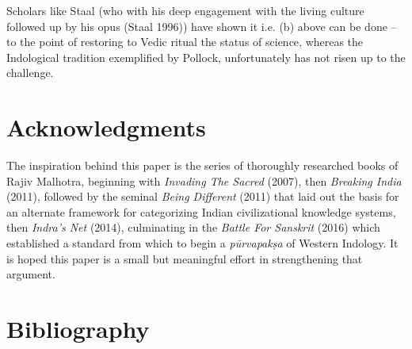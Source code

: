 Scholars like Staal (who with his deep engagement with the living culture followed up by his opus (Staal 1996)) have shown it i.e. (b) above can be done – to the point of restoring to Vedic ritual the status of science, whereas the Indological tradition exemplified by Pollock, unfortunately has not risen up to the challenge.


\section*{Acknowledgments}

The inspiration behind this paper is the series of thoroughly researched books of Rajiv Malhotra, beginning with \textit{Invading The Sacred} (2007), then \textit{Breaking India} (2011), followed by the seminal \textit{Being Different} (2011) that laid out the basis for an alternate framework for categorizing Indian civilizational knowledge systems, then \textit{Indra’s Net} (2014), culminating in the \textit{Battle For Sanskrit} (2016) which established a standard from which to begin a \textit{pūrvapakṣa} of Western Indology. It is hoped this paper is a small but meaningful effort in strengthening that argument.


\section*{Bibliography}

